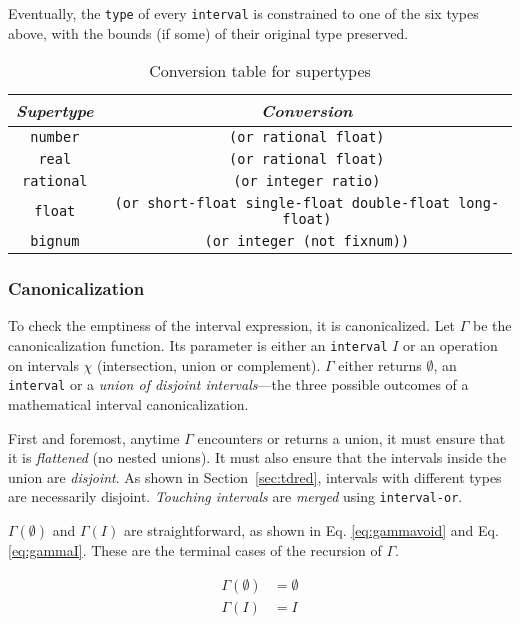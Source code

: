 \documentclass[format=sigconf]{acmart}
\newcommand\code[2][\small]{\sloppy\texttt{#1#2}}
\theoremstyle{definition}
\begin{document}
Eventually, the \code{type} of every \code{interval} is constrained to one of
the six types above, with the bounds (if some) of their original type preserved.

\begin{table}
  \centering
  \begin{tabular}{|c|c|}
    \hline
    \emph{Supertype} & \emph{Conversion} \\
    \hline
    \code{number} & \code{(or rational float)} \\
    \code{real} & \code{(or rational float)} \\
    \code{rational} & \code{(or integer ratio)} \\
    \code{float} & \code[\scriptsize]{(or short-float single-float double-float long-float)} \\
    \code{bignum} & \code{(or integer (not fixnum))} \\
    \hline
  \end{tabular}
  \caption{Conversion table for supertypes}
  \label{tab:numequiv}
\end{table}

\subsubsection{Canonicalization}
To check the emptiness of the interval expression, it is canonicalized. Let
$\Gamma$ be the canonicalization function. Its parameter is either an
\code{interval} $I$ or an operation on intervals $\chi$ (intersection, union or
complement). $\Gamma$ either returns $\emptyset$, an \code{interval} or a
\emph{union of disjoint intervals}---the three possible outcomes of a
mathematical interval canonicalization.

First and foremost, anytime $\Gamma$ encounters or returns a union, it must
ensure that it is \emph{flattened} (no nested unions). It must also ensure that
the intervals inside the union are \emph{disjoint}. As shown in
Section~\ref{sec:tdred}, intervals with different types are necessarily
disjoint. \emph{Touching intervals} \cite{baker1992} are \emph{merged} using
\code{interval-or}.

$\Gamma(\emptyset)$ and $\Gamma(I)$ are straightforward, as shown in Eq.
\ref{eq:gammavoid} and Eq. \ref{eq:gammaI}. These are the terminal cases of the
recursion of $\Gamma$.

\begin{align}
  \Gamma(\emptyset) &= \emptyset \label{eq:gammavoid}\tag{end-$\emptyset$}\\
  \Gamma(I) &= I \label{eq:gammaI}\tag{end-$I$}
\end{align}
\end{document}
